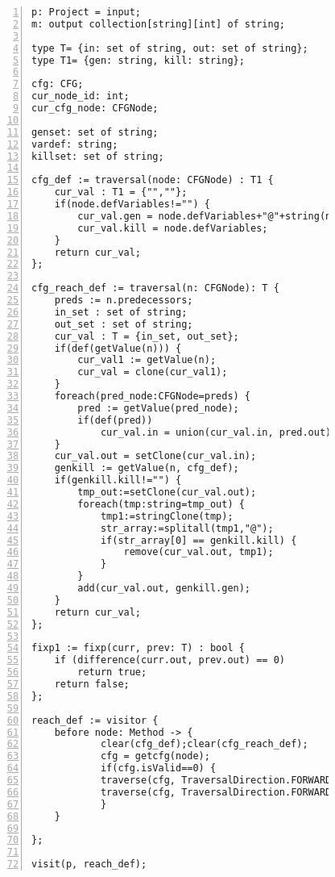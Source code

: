 \begin{figure}[ht!]
\begin{lstlisting}[numbers=left, tabsize=4, caption={Reaching definition analysis},label={lst:rd-code},lastline=55] 
p: Project = input;
m: output collection[string][int] of string;

type T= {in: set of string, out: set of string};
type T1= {gen: string, kill: string};

cfg: CFG;
cur_node_id: int;
cur_cfg_node: CFGNode;

genset: set of string;
vardef: string;
killset: set of string;

cfg_def := traversal(node: CFGNode) : T1 {
	cur_val : T1 = {"",""};
	if(node.defVariables!="") {
		cur_val.gen = node.defVariables+"@"+string(node.id);
		cur_val.kill = node.defVariables;
	}
	return cur_val;
};

cfg_reach_def := traversal(n: CFGNode): T {
	preds := n.predecessors;
	in_set : set of string;
	out_set : set of string;
	cur_val : T = {in_set, out_set};
	if(def(getValue(n))) {
		cur_val1 := getValue(n);
		cur_val = clone(cur_val1);
	}
	foreach(pred_node:CFGNode=preds) {	
		pred := getValue(pred_node);
		if(def(pred))
			cur_val.in = union(cur_val.in, pred.out);
	}
	cur_val.out = setClone(cur_val.in);
	genkill := getValue(n, cfg_def);
	if(genkill.kill!="") {
		tmp_out:=setClone(cur_val.out);
		foreach(tmp:string=tmp_out) {
			tmp1:=stringClone(tmp);
			str_array:=splitall(tmp1,"@");
			if(str_array[0] == genkill.kill) {
				remove(cur_val.out, tmp1);
			}
		}
		add(cur_val.out, genkill.gen);
	}
	return cur_val;
};

fixp1 := fixp(curr, prev: T) : bool {
	if (difference(curr.out, prev.out) == 0)
		return true;	
	return false;
};

reach_def := visitor {
	before node: Method -> {
			clear(cfg_def);clear(cfg_reach_def);
			cfg = getcfg(node);
			if(cfg.isValid==0) {
			traverse(cfg, TraversalDirection.FORWARD, TraversalKind.ITERATIVE, cfg_def);
			traverse(cfg, TraversalDirection.FORWARD, TraversalKind.HYBRID, cfg_reach_def, fixp1);
			}
	}

};

visit(p, reach_def);
\end{lstlisting}
\end{figure}